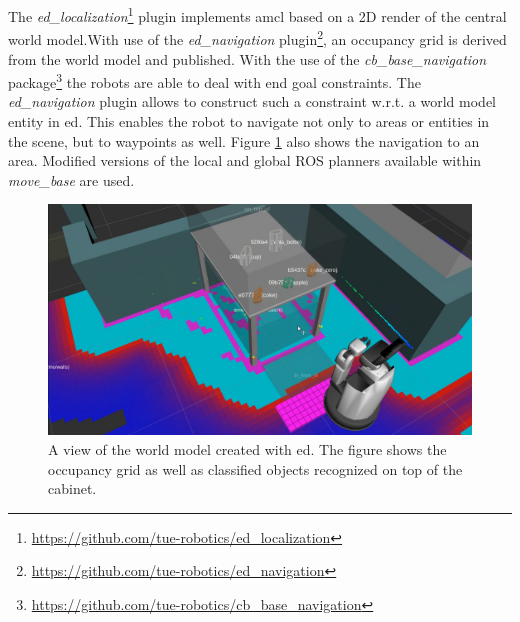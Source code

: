 The \emph{ed\_localization}\footnote{\url{https://github.com/tue-robotics/ed_localization}} plugin implements \acrshort{amcl} based on a 2D render of the central world model.With use of the \emph{ed\_navigation} plugin\footnote{\url{https://github.com/tue-robotics/ed_navigation}}, an occupancy grid is derived from the world model and published. With the use of the \emph{cb\_base\_navigation} package\footnote{\url{https://github.com/tue-robotics/cb_base_navigation}} the robots are able to deal with end goal constraints. The \emph{ed\_navigation} plugin allows to construct such a constraint w.r.t. a world model entity in \acrshort{ed}. This enables the robot to navigate not only to areas or entities in the scene, but to waypoints as well. Figure \ref{fig:ed_segmentation} also shows the navigation to an area.
Modified versions of the local and global ROS planners available within \emph{move\_base} are used.
\begin{figure}[H]
	\centering
	\includegraphics[width = 0.8\linewidth]{Figures/ed_segmentation_hsr}
	\caption{A view of the world model created with \acrshort{ed}. The figure shows the occupancy grid as well as classified objects recognized on top of the cabinet.}
	\label{fig:ed_segmentation}
\end{figure}
